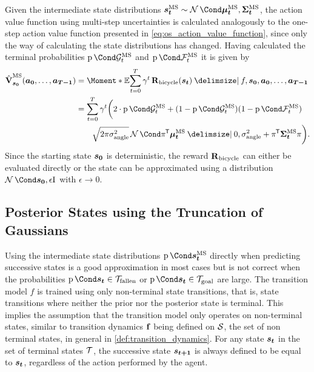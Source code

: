 Given the intermediate state distributions $\ms{\rv{s_t}} \sim \Gaussian{\ms{\mat{\mu_t}}, \ms{\mat{\Sigma_t}}}$, the action value function using multi-step uncertainties is calculated analogously to the one-step action value function presented in \cref{eq:os_action_value_function}, since only the way of calculating the state distributions has changed.
Having calculated the terminal probabilities $\Prob{\ms{\PGoal_t}}$ and $\Prob{\ms{\PFallen_t}}$ it is given by
\begin{align}
    \label{eq:ms_action_value_function}
    \begin{split}
        \ms{\AVlu}_{\mat{s_0}}(\mat{a_0}, \dots, \mat{a_{T-1}}) &= \Moment*{\E}{\sum_{t=0}^T \gamma^t \RwdBicycle(\mat{s_t}) \given f, \mat{s_0}, \mat{a_0}, \dots, \mat{a_{T-1}}} \\
        &= \sum_{t=0}^T \gamma^t \bigg( 2 \cdot \Prob{\ms{\PGoal}_t} + (1 - \Prob{\ms{\PGoal}_t})(1 - \Prob{\ms{\PFallen}_t}) \\
    &\qquad \sqrt{2\pi\sigma_{\text{angle}}^2} \Gaussian{\pi\tran \ms{\mat{\mu_t}} \given 0, \sigma_{\text{angle}}^2 + \pi\tran \ms{\mat{\Sigma_t}}\pi} \bigg).
    \end{split}
\end{align}
Since the starting state $\bm{s_0}$ is deterministic, the reward $\operatorname{\operatorname{\mathbf{R}}_{\text{bicycle}}}$ can either be evaluated directly or the state can be approximated using a distribution $\Gaussian{\mat{s_0}, \epsilon\Eye}$ with $\epsilon \to 0$.

\subsection{Posterior States using the Truncation of Gaussians}
Using the intermediate state distributions $\Prob{\ms{\rv{s_t}}}$ directly when predicting successive states is a good approximation in most cases but is not correct when the probabilities $\Prob{\rv{s_t} \in \Fallen}$ or $\Prob{\rv{s_t} \in \Goal}$ are large.
The transition model $f$ is trained using only non-terminal state transitions, that is, state transitions where neither the prior nor the posterior state is terminal.
This implies the assumption that the transition model only operates on non-terminal states, similar to transition dynamics $\operatorname{\mathbf{f}}$ being defined on $\mathcal{S}$, the set of non terminal states, in general in \cref{def:transition_dynamics}.
For any state $\bm{s_t}$ in the set of terminal states $\mathcal{T}$, the successive state $\bm{s_{t+1}}$ is always defined to be equal to $\bm{s_t}$, regardless of the action performed by the agent.

